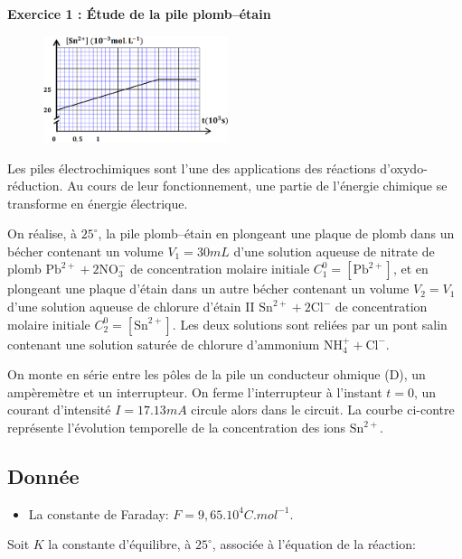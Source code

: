 \documentclass[12pt, french]{article}
\begin{document}
\begin{Box2}{\textbf{Exercice 1 : Étude de la pile plomb–étain}}
\begin{figure}
  \begin{center}
	  \vspace{-2cm}
	\includegraphics[width=0.48\textwidth]{./fig00P.png}
  \end{center}
\end{figure}
Les piles électrochimiques sont l'une des applications des réactions d'oxydo-réduction. Au cours de leur fonctionnement, une partie de l'énergie chimique se transforme en énergie électrique.

  On réalise, à $25^{\circ}$, la pile plomb–étain en plongeant une plaque de plomb dans un bécher contenant un volume $V_1 = 30 mL$ d’une solution aqueuse de nitrate de plomb $\text{Pb}^{2+} + 2\text{NO}_3^-$ de concentration molaire initiale $C_1^{0} = [\text{Pb}^{2+}]$, et en plongeant une plaque d’étain dans un autre bécher contenant un volume $V_2 = V_1$ d’une solution aqueuse de chlorure d’étain II $\text{Sn}^{2+} + 2\text{Cl}^-$ de concentration molaire initiale $C_2^{0} = [\text{Sn}^{2+}]$. Les deux solutions sont reliées par un pont salin contenant une solution saturée de chlorure d’ammonium $\text{NH}_4^+ + \text{Cl}^-$. 

On monte en série entre les pôles de la pile un conducteur ohmique (D), un ampèremètre et un interrupteur. On ferme l’interrupteur à l’instant $t=0$, un courant d’intensité $I = 17.13mA$ circule alors dans le circuit. La courbe ci-contre représente l’évolution temporelle de la concentration des ions $\text{Sn}^{2+}$.

\subsection*{Donnée} 
\begin{itemize}
  \item La constante de Faraday: $F=9,65.10^{4}C.mol^{-1}$.
\end{itemize}

  Soit $K$ la constante d’équilibre, à $25^{\circ}$, associée à l’équation de la réaction:


\end{Box2}
\end{document}
